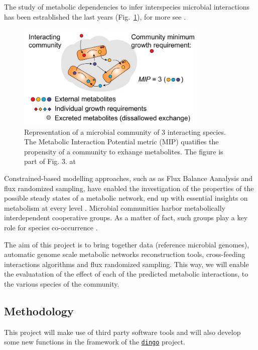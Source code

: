 \documentclass{article}
\begin{document}
The study of metabolic dependencies to infer interspecies microbial interactions has been estrablished the last years (Fig.~\ref{interacting_community}), for more see \cite{zelezniak2015metabolic}.


\begin{figure}[h]
\label{interacting_community}
   \centering
   \includegraphics[width=0.8\textwidth]{interacting_community.png}
   \caption{Representation of a microbial community of 3 interacting species. 
   The Metabolic Interaction Potential metric (MIP) quatifies the propensity of a community to exhange metabolites. The figure is part of Fig. 3. at \cite{zelezniak2015metabolic}}
\end{figure}


Constrained-based modelling approaches, such as as Flux Balance Aanalysis and flux randomized sampling, have enabled the investigation of the properties of the possible steady states of a metabolic network,
end up with essential insights on metabolism at every level \cite{muller2018using, vieira2019comparison}.
Microbial communities harbor metabolically interdependent cooperative groups.
As a matter of fact, such groups play a key role for species co-occurrence \cite{zelezniak2015metabolic}.


The aim of this project is to bring together 
data (reference microbial genomes), 
automatic genome scale metabolic networks reconstruction tools,
cross-feeding interactions algorithms 
and flux randomized sampling.
This way, we will enable the evaluatation of the 
effect of each of the predicted metabolic interactions, 
to the various species of the community. 


\subsection{Methodology}

This project will make use of third party software tools and will also develop 
some new functions in the framework of the 
\href{https://github.com/GeomScale/dingo/}{\texttt{dingo}} project. 
\end{document}
